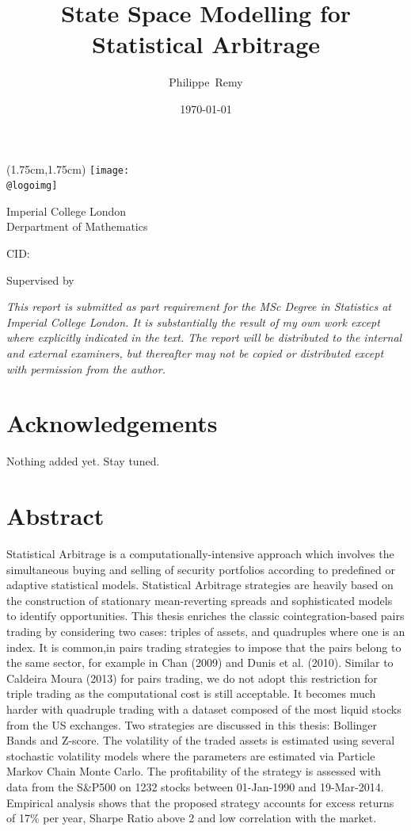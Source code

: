 \documentclass[11pt,a4,twosided,singlespacing,titlepagenumber=on]{scrreprt}
\title{State Space Modelling for Statistical Arbitrage}
\author{Philippe~Remy}
\date{\today}
\makeatletter
\numberwithin{equation}{chapter} %
\theoremstyle{remark}
\renewcommand{\maketitle}{
\begin{titlepage}
\ifdefined\@logoimg
\begin{textblock*}{8cm}(1.75cm,1.75cm)
\texttt{[image: \\@logoimg]}
\end{textblock*}
\vspace*{1cm}
\else
\fi
\begin{center}
\vspace*{\stretch{0.1}}
Imperial College London\\
Derpartment of Mathematics\par
\vspace*{\stretch{1}} %
{\titlefont\Huge \@title\par} %
\vspace*{\stretch{2}}
{\Large \@author \par}
\vspace*{1em}
{\large CID: \@CID \par}
\vspace*{\stretch{0.5}}
{\large Supervised by \@supervisor \par}
\vspace*{\stretch{3}}
{\Large \@date \par}
\vspace*{\stretch{1}}

\textit{This report is submitted as part requirement for the MSc Degree in Statistics at Imperial College London. It is substantially the result of my own work except where explicitly indicated in the text.
The report will be distributed to the internal and external examiners, but thereafter may not be
copied or distributed except with permission from the author.}
\vspace*{\stretch{0.1}}
\end{center}%
\end{titlepage}%
}
\renewenvironment{abstract}%
{\chapter*{Abstract}\thispagestyle{plain}}%
{\clearpage}
\makeatother
\begin{document}


\maketitle

\renewcommand{\contentsname}{Table of Contents}
\tableofcontents

\listoffigures
\listoftables


\chapter*{Acknowledgements}
Nothing added yet. Stay tuned.

\begin{abstract}
Statistical Arbitrage is a computationally-intensive approach which involves the simultaneous buying and selling of security portfolios according to predefined or adaptive statistical models. Statistical Arbitrage strategies are heavily based on the construction of stationary mean-reverting spreads and sophisticated models to identify opportunities. This thesis enriches the classic cointegration-based pairs trading by considering two cases: triples of assets, and quadruples where one is an index. It is common,in pairs trading strategies to impose that the pairs belong to the same sector, for example in Chan (2009) and Dunis et al. (2010). Similar to Caldeira Moura (2013) for pairs trading, we do not adopt this restriction for triple trading as the computational cost is still acceptable. It becomes much harder with quadruple trading with a dataset composed of the most liquid stocks from the US exchanges. Two strategies are discussed in this thesis: Bollinger Bands and Z-score. The volatility of the traded assets is estimated using several stochastic volatility models where the parameters are estimated via Particle Markov Chain Monte Carlo. The profitability of the strategy is assessed with data from the S\&P500 on 1232 stocks between 01-Jan-1990 and 19-Mar-2014. Empirical analysis shows that the proposed strategy accounts for excess returns of 17\% per year, Sharpe Ratio above 2 and low correlation with the market.

\end{abstract}
\newpage



\end{document}
